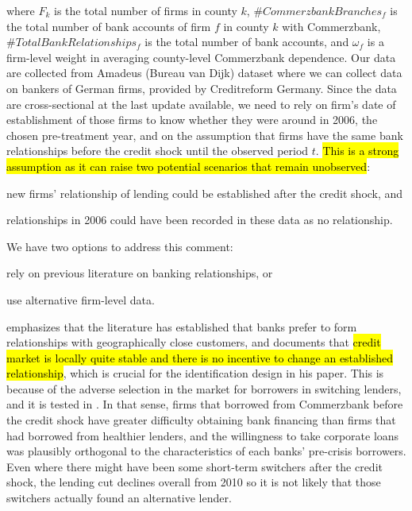 \documentclass[11pt]{article}
\begin{document}
where $F_{k}$ is the total number of firms in county $k$, $\# CommerzbankBranches_{f}$ is the total number of bank accounts of firm $f$ in county $k$ with Commerzbank, $\# Total Bank Relationships_{f}$ is the total number of bank accounts, and $\omega_{f}$ is a firm-level weight in averaging county-level Commerzbank dependence. Our data are collected from Amadeus (Bureau van Dijk) dataset where we can collect data on bankers of German firms, provided by Creditreform Germany. Since the data are cross-sectional at the last update available, we need to rely on firm's date of establishment of those firms to know whether they were around in 2006, the chosen pre-treatment year, and on the assumption that firms have the same bank relationships before the credit shock until the observed period $t$. \hl{This is a strong assumption as it can raise two potential scenarios that remain unobserved}:
\begin{inlinelist}
    \item new firms' relationship of lending could be established after the credit shock, and
    \item relationships in 2006 could have been recorded in these data as no relationship.
\end{inlinelist}
We have two options to address this comment:
\begin{inlinelist}
    \item rely on previous literature on banking relationships, or
    \item use alternative firm-level data.
\end{inlinelist}

\citet{bib:huber2018} emphasizes that the literature has established that banks prefer to form relationships with geographically close customers, and \citet{bib:chodorow-reich2014} documents that \hl{credit market is locally quite stable and there is no incentive to change an established relationship}, which is crucial for the identification design in his paper. This is because of the adverse selection in the market for borrowers in switching lenders, and it is tested in \citet{bib:chodorow-reich2014}. In that sense, firms that borrowed from Commerzbank before the credit shock have greater difficulty obtaining bank financing than firms that had borrowed from healthier lenders, and the willingness to take corporate loans was plausibly orthogonal to the characteristics of each banks' pre-crisis borrowers. Even where there might have been some short-term switchers after the credit shock, the lending cut declines overall from 2010 so it is not likely that those switchers actually found an alternative lender.
\end{document}

